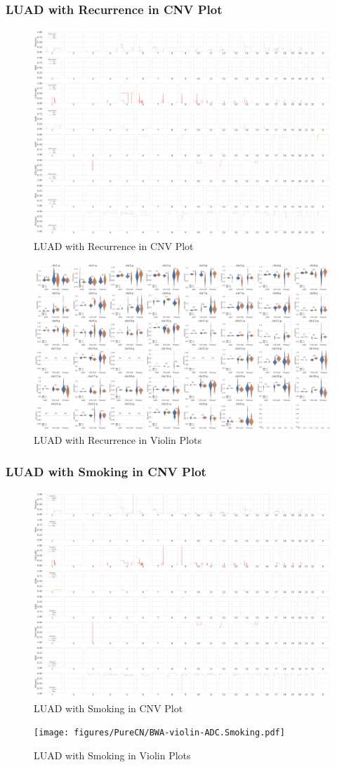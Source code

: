 \documentclass{beamer}
\begin{document}
    \begin{frame}[allowframebreaks]
        \frametitle{LUAD with Recurrence in CNV Plot}

        \begin{figure}
            \includegraphics[width=0.6 \linewidth]{figures/PureCN/BWA-simple-ADC.Recurrence.pdf}
            \caption{LUAD with Recurrence in CNV Plot}
        \end{figure}

        \begin{figure}
            \includegraphics[width=0.8 \linewidth]{figures/PureCN/BWA-violin-ADC.Recurrence.pdf}
            \caption{LUAD with Recurrence in Violin Plots}
        \end{figure}
    \end{frame}

    \begin{frame}[allowframebreaks]
        \frametitle{LUAD with Smoking in CNV Plot}

        \begin{figure}
            \includegraphics[width=0.6 \linewidth]{figures/PureCN/BWA-simple-ADC.Smoking.pdf}
            \caption{LUAD with Smoking in CNV Plot}
        \end{figure}

        \begin{figure}
            \texttt{[image: figures/PureCN/BWA-violin-ADC.Smoking.pdf]}
            \caption{LUAD with Smoking in Violin Plots}
        \end{figure}
    \end{frame}
\end{document}
